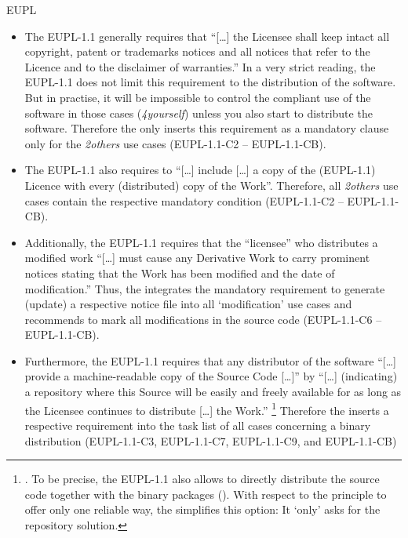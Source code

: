 \begin{license}{EUPL}
\begin{itemize}
\item The EUPL-1.1 generally requires that \enquote{[\ldots] the Licensee shall
  keep intact all copyright, patent or trademarks notices and all notices that
  refer to the Licence and to the disclaimer of warranties.} 
  In a very strict reading, the EUPL-1.1 does not limit this requirement to the
  distribution of the software. But in practise, it will be impossible to
  control the compliant use of the software in those cases (\emph{4yourself})
  unless you also start to distribute the software. Therefore the \oslic{} only
  inserts this requirement as a mandatory clause only for the \emph{2others} use 
  cases (EUPL-1.1-C2 -- EUPL-1.1-CB). 
  
\item The EUPL-1.1 also requires to \enquote{[\ldots] include [\ldots] a copy of
  the (EUPL-1.1) Licence with every (distributed) copy of the Work}.
  Therefore, all \emph{2others} use cases contain the respective mandatory
  condition (EUPL-1.1-C2 -- EUPL-1.1-CB).
  
\item Additionally, the EUPL-1.1 requires that the \enquote{licensee} who
  distributes a modified work \enquote{[\ldots] must cause any Derivative Work 
  to carry prominent notices stating that the Work has been modified and the
  date of modification.} 
  Thus, the \oslic{} integrates the mandatory requirement to generate (update) a
  respective notice file into all `modification' use cases and recommends to mark
  all modifications in the source code (EUPL-1.1-C6 -- EUPL-1.1-CB).
  
\item Furthermore, the EUPL-1.1 requires that any distributor of the software
  \enquote{[\ldots] provide a machine-readable copy of the Source Code [\ldots]}
  by \enquote{[\ldots] (indicating) a repository where this Source will be
  easily and freely available for as long as the Licensee continues to
  distribute [\ldots] the Work.}%
  \footnote{\cite[cf.][\nopage wp.\ §5]{EuplLicense2007en}. To be precise, the
    EUPL-1.1 also allows to directly distribute the source code together with the
    binary packages (\cite[cf.][\nopage wp.\ §3]{EuplLicense2007en}). With
    respect to the \oslic{} principle to offer only one reliable way, the \oslic{}
    simplifies this option: It `only' asks for the repository solution.} 
  Therefore the \oslic{} inserts a respective requirement into the task list of all
  cases concerning a binary distribution (EUPL-1.1-C3, EUPL-1.1-C7, EUPL-1.1-C9, and EUPL-1.1-CB)
  

\end{itemize}
\end{license}
